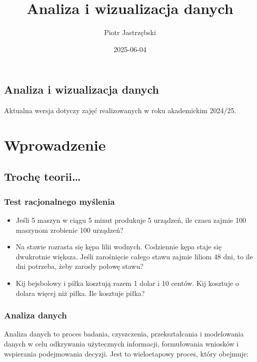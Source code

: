 \documentclass[
  polish,
  letterpaper,
  DIV=11,
  numbers=noendperiod]{scrreprt}
\title{Analiza i wizualizacja danych}
\author{Piotr Jastrzębski}
\date{2025-06-04}
\providecommand{\tightlist}{%
  \setlength{\itemsep}{0pt}\setlength{\parskip}{0pt}}
\renewcommand*\contentsname{Spis treści}
\newcommand\contentsname{Spis treści}
\begin{document}
\maketitle

\renewcommand*\contentsname{Spis treści}
{
\hypersetup{linkcolor=}
\setcounter{tocdepth}{2}
\tableofcontents
}

\chapter{Analiza i wizualizacja
danych}\label{analiza-i-wizualizacja-danych}

Aktualna wersja dotyczy zajęć realizowanych w roku akademickim 2024/25.

\part{Wprowadzenie}

\chapter{Trochę teorii\ldots{}}\label{trochux119-teorii}

\section{Test racjonalnego
myślenia}\label{test-racjonalnego-myux15blenia}

\begin{itemize}
\tightlist
\item
  Jeśli 5 maszyn w ciągu 5 minut produkuje 5 urządzeń, ile czasu zajmie
  100 maszynom zrobienie 100 urządzeń?
\item
  Na stawie rozrasta się kępa lilii wodnych. Codziennie kępa staje się
  dwukrotnie większa. Jeśli zarośnięcie całego stawu zajmie liliom 48
  dni, to ile dni potrzeba, żeby zarosły połowę stawu?
\item
  Kij bejsbolowy i piłka kosztują razem 1 dolar i 10 centów. Kij
  kosztuje o dolara więcej niż piłka. Ile kosztuje piłka?
\end{itemize}

\section{Analiza danych}\label{analiza-danych}

Analiza danych to proces badania, czyszczenia, przekształcania i
modelowania danych w celu odkrywania użytecznych informacji,
formułowania wniosków i wspierania podejmowania decyzji. Jest to
wieloetapowy proces, który obejmuje:
\end{document}
